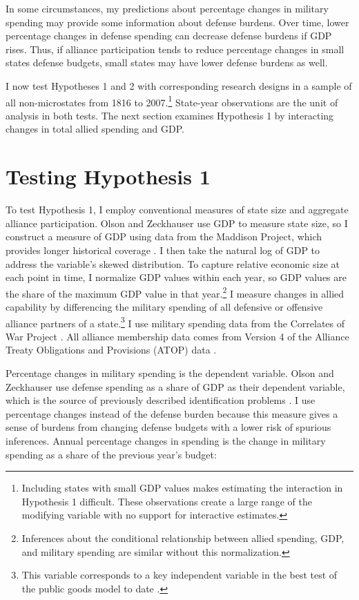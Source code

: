 \documentclass[12pt]{article}
\begin{document}
In some circumstances, my predictions about percentage changes in military spending may provide some information about defense burdens. 
Over time, lower percentage changes in defense spending can decrease defense burdens if GDP rises. 
Thus, if alliance participation tends to reduce percentage changes in small states defense budgets, small states may have lower defense burdens as well. 


I now test Hypotheses 1 and 2 with corresponding research designs in a sample of all non-microstates from 1816 to 2007.\footnote{Including states with small GDP values makes estimating the interaction in Hypothesis 1 difficult. These observations create a large range of the modifying variable with no support for interactive estimates.}
State-year observations are the unit of analysis in both tests.  
The next section examines Hypothesis 1 by interacting changes in total allied spending and GDP.


\section{Testing Hypothesis 1}


To test Hypothesis 1, I employ conventional measures of state size and aggregate alliance participation. 
Olson and Zeckhauser use GDP to measure state size, so I construct a measure of GDP using data from the Maddison Project, which provides longer historical coverage \citep{Boltetal2018}. 
I then take the natural log of GDP to address the variable's skewed distribution. 
To capture relative economic size at each point in time, I normalize GDP values within each year, so GDP values are the share of the maximum GDP value in that year.\footnote{Inferences about the conditional relationship between allied spending, GDP, and military spending are similar without this normalization.} 
I measure changes in allied capability by differencing the military spending of all defensive or offensive alliance partners of a state.\footnote{This variable corresponds to a key independent variable in the best test of the public goods model to date \citep{PluemperNeumayer2015}.}
I use military spending data from the Correlates of War Project \citep{SingerCINC1988}.  
All alliance membership data comes from Version 4 of the Alliance Treaty Obligations and Provisions (ATOP) data \citep{Leedsetal2002}.  


Percentage changes in military spending is the dependent variable. 
Olson and Zeckhauser use defense spending as a share of GDP as their dependent variable, which is the source of previously described identification problems \citep{Kronmal1993, PluemperNeumayer2015}. 
I use percentage changes instead of the defense burden because this measure gives a sense of burdens from changing defense budgets with a lower risk of spurious inferences. 
Annual percentage changes in spending is the change in military spending as a share of the previous year's budget:
\end{document}
